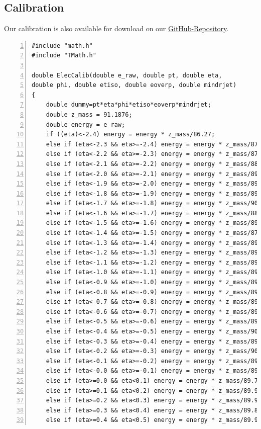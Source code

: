 \documentclass[11pt,a4paper,notitlepage]{scrartcl}
\begin{document}
\subsection*{Calibration}
Our calibration is also available for download on our \hyperref{https://github.com/krausejm/advanced_lab_course}{}{}{GitHub-Repository}.
\lstset{language=C}
\begin{lstlisting}[numbers=left, breaklines=true]
#include "math.h"
#include "TMath.h"

double ElecCalib(double e_raw, double pt, double eta, 
double phi, double etiso, double eoverp, double mindrjet)
{
	double dummy=pt*eta*phi*etiso*eoverp*mindrjet;
	double z_mass = 91.1876;
	double energy = e_raw;
	if ((eta)<-2.4) energy = energy * z_mass/86.27;
	else if (eta<-2.3 && eta>=-2.4) energy = energy * z_mass/87.11;
	else if (eta<-2.2 && eta>=-2.3) energy = energy * z_mass/87.64;
	else if (eta<-2.1 && eta>=-2.2) energy = energy * z_mass/88.42;
	else if (eta<-2.0 && eta>=-2.1) energy = energy * z_mass/89.30;
	else if (eta<-1.9 && eta>=-2.0) energy = energy * z_mass/89.44;
	else if (eta<-1.8 && eta>=-1.9) energy = energy * z_mass/89.55;
	else if (eta<-1.7 && eta>=-1.8) energy = energy * z_mass/90.25;
	else if (eta<-1.6 && eta>=-1.7) energy = energy * z_mass/88.73;
	else if (eta<-1.5 && eta>=-1.6) energy = energy * z_mass/89.42;
	else if (eta<-1.4 && eta>=-1.5) energy = energy * z_mass/87.31;
	else if (eta<-1.3 && eta>=-1.4) energy = energy * z_mass/89.53;
	else if (eta<-1.2 && eta>=-1.3) energy = energy * z_mass/89.44;
	else if (eta<-1.1 && eta>=-1.2) energy = energy * z_mass/89.26;
	else if (eta<-1.0 && eta>=-1.1) energy = energy * z_mass/89.58;
	else if (eta<-0.9 && eta>=-1.0) energy = energy * z_mass/89.08;
	else if (eta<-0.8 && eta>=-0.9) energy = energy * z_mass/89.56;
	else if (eta<-0.7 && eta>=-0.8) energy = energy * z_mass/89.54;
	else if (eta<-0.6 && eta>=-0.7) energy = energy * z_mass/89.82;
	else if (eta<-0.5 && eta>=-0.6) energy = energy * z_mass/89.82;
	else if (eta<-0.4 && eta>=-0.5) energy = energy * z_mass/90.20;
	else if (eta<-0.3 && eta>=-0.4) energy = energy * z_mass/89.88;
	else if (eta<-0.2 && eta>=-0.3) energy = energy * z_mass/90.06;
	else if (eta<-0.1 && eta>=-0.2) energy = energy * z_mass/89.82;
	else if (eta<-0.0 && eta>=-0.1) energy = energy * z_mass/89.98;
	else if (eta>=0.0 && eta<0.1) energy = energy * z_mass/89.78;
	else if (eta>=0.1 && eta<0.2) energy = energy * z_mass/89.99;
	else if (eta>=0.2 && eta<0.3) energy = energy * z_mass/89.92;
	else if (eta>=0.3 && eta<0.4) energy = energy * z_mass/89.83;
	else if (eta>=0.4 && eta<0.5) energy = energy * z_mass/89.96;

\end{lstlisting}
\end{document}
